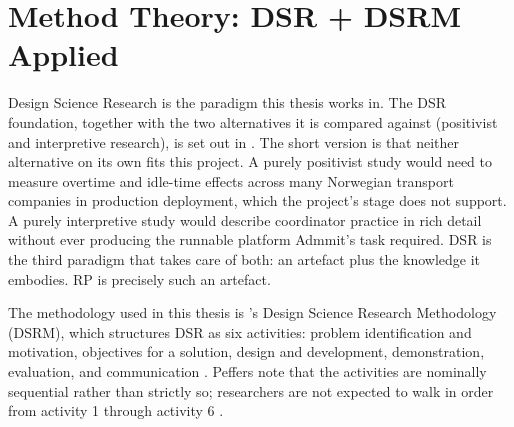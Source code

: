 \section{Method Theory: DSR + DSRM Applied}
\label{sec:dsr-dsrm}

Design Science Research is the paradigm this thesis works in. The DSR foundation, together with the two alternatives it is compared against (positivist and interpretive research), is set out in . The short version is that neither alternative on its own fits this project. A purely positivist study would need to measure overtime and idle-time effects across many Norwegian transport companies in production deployment, which the project's stage does not support. A purely interpretive study would describe coordinator practice in rich detail without ever producing the runnable platform Admmit's task required. DSR is the third paradigm that takes care of both: an artefact plus the knowledge it embodies. RP is precisely such an artefact.

The methodology used in this thesis is \textcite{peffers2007dsrm}'s Design Science Research Methodology (DSRM), which structures DSR as six activities: problem identification and motivation, objectives for a solution, design and development, demonstration, evaluation, and communication \parencite[p.~46]{peffers2007dsrm}. Peffers note that the activities are nominally sequential rather than strictly so; researchers are not expected to walk in order from activity 1 through activity 6 \parencite[p.~56]{peffers2007dsrm}.

